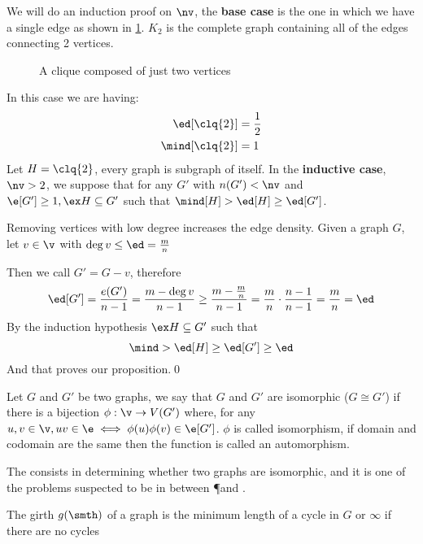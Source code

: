 \begin{prf}
    We will do an induction proof on $\nv$, the \textbf{base case} is the one in which we have a single edge as shown in \ref*{fig:k_2}. $K_2$ is the complete graph containing all of the edges connecting 2 vertices.
    \begin{figure}[h]
        \centering
        
        \caption{A clique composed of just two vertices}
        \label{fig:k_2}
    \end{figure}

    In this case we are having:
    \begin{align*}
        \ed[\clq{2}] &= \frac{1}{2} \\
        \mind[\clq{2}] &= 1
    \end{align*}
    Let $H = \clq{2}$, every graph is subgraph of itself.
    In the \textbf{inductive case}, $\nv > 2$, we suppose that for any $G'$ with $n(G') < \nv$ and $\e[G'] \geq 1, \ex H \subseteq G'$ such that $\mind[H] > \ed[H] \geq \ed[G']$.
    
    Removing vertices with low degree increases the edge density. Given a graph $G$, let $v \in \v$ with $\deg{v} \leq \ed = \frac{m}{n}$

    Then we call $G' = G - v$, therefore
    \begin{equation*}
        \ed[G'] = \frac{e(G')}{n - 1} = \frac{m - \deg{v}}{n - 1} \geq \frac{m - \frac{m}{n}}{n - 1} = \frac{m}{n} \cdot \frac{n - 1}{n - 1} = \frac{m}{n} = \ed
    \end{equation*}
    By the induction hypothesis $\ex H \subseteq G'$ such that
    \begin{equation*}
        \mind > \ed[H] \geq \ed[G'] \geq \ed
    \end{equation*}
    And that proves our proposition.\qed
\end{prf}
Let $G$ and $G'$ be two graphs, we say that $G$ and $G'$ are isomorphic ($G \cong G'$) if there is a bijection $\phi: \v \rightarrow V(G')$ where, for any $u, v \in \v, uv \in \e \iff \phi(u)\phi(v) \in \e[G']$. $\phi$ is called isomorphism, if domain and codomain are the same then the function is called an automorphism.
\begin{coolfact}
    The  consists in determining whether two graphs are isomorphic, and it is one of the problems suspected to be in between \P and \NP.
\end{coolfact}
\begin{definition}[Girth]
    The girth $g(\smth)$ of a graph is the minimum length of a cycle in $G$ or $\infty$ if there are no cycles
\end{definition}
